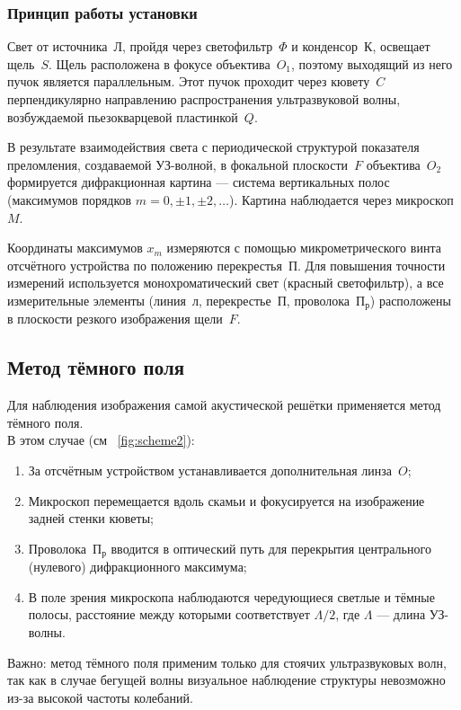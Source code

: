 \documentclass[a4paper]{article}
\begin{document}
\subsubsection*{Принцип работы установки}

Свет от источника~$Л$, пройдя через светофильтр~$\Phi$ и конденсор~$К$, освещает щель~$S$. Щель расположена в фокусе объектива~$O_1$, поэтому выходящий из него пучок является параллельным. Этот пучок проходит через кювету~$C$ перпендикулярно направлению распространения ультразвуковой волны, возбуждаемой пьезокварцевой пластинкой~$Q$.

В результате взаимодействия света с периодической структурой показателя преломления, создаваемой УЗ-волной, в фокальной плоскости~$F$ объектива~$O_2$ формируется дифракционная картина --- система вертикальных полос (максимумов порядков $m = 0, \pm 1, \pm 2, \ldots$). Картина наблюдается через микроскоп~$M$.

Координаты максимумов $x_m$ измеряются с помощью микрометрического винта отсчётного устройства по положению перекрестья~$П$. Для повышения точности измерений используется монохроматический свет (красный светофильтр), а все измерительные элементы (линия~$л$, перекрестье~$П$, проволока~$П_{\text{р}}$) расположены в плоскости резкого изображения щели~$F$.

\subsection{Метод тёмного поля}

Для наблюдения изображения самой акустической решётки применяется метод тёмного поля. \\В этом случае (см ~\ref{fig:scheme2}):
\begin{enumerate}
    \item За отсчётным устройством устанавливается дополнительная линза~$O$;
    \item Микроскоп перемещается вдоль скамьи и фокусируется на изображение задней стенки кюветы;
    \item Проволока~$П_{\text{р}}$ вводится в оптический путь для перекрытия центрального (нулевого) дифракционного максимума;
    \item В поле зрения микроскопа наблюдаются чередующиеся светлые и тёмные полосы, расстояние между которыми соответствует $\Lambda/2$, где $\Lambda$ --- длина УЗ-волны.
\end{enumerate}

Важно: метод тёмного поля применим только для стоячих ультразвуковых волн, так как в случае бегущей волны визуальное наблюдение структуры невозможно из-за высокой частоты колебаний.
\end{document}
